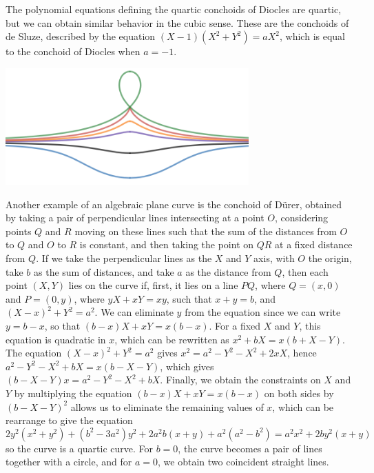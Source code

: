 \begin{example}
    The polynomial equations defining the quartic conchoids of Diocles are quartic, but we can obtain similar behavior in the cubic sense. These are the conchoids of de Sluze, described by the equation $(X-1)(X^2 + Y^2) = aX^2$, which is equal to the conchoid of Diocles when $a = -1$.

    \begin{center}
        \includegraphics[width=0.7\textwidth]{algebraicGeometryConchoidDesluze}
    \end{center}
\end{example}

\begin{example}
    Another example of an algebraic plane curve is the conchoid of D\"{u}rer, obtained by taking a pair of perpendicular lines intersecting at a point $O$, considering points $Q$ and $R$ moving on these lines such that the sum of the distances from $O$ to $Q$ and $O$ to $R$ is constant, and then taking the point on $QR$ at a fixed distance from $Q$. If we take the perpendicular lines as the $X$ and $Y$ axis, with $O$ the origin, take $b$ as the sum of distances, and take $a$ as the distance from $Q$, then each point $(X,Y)$ lies on the curve if, first, it lies on a line $PQ$, where $Q = (x,0)$ and $P = (0,y)$, where $yX + xY = xy$, such that $x + y = b$, and $(X - x)^2 + Y^2 = a^2$. We can eliminate $y$ from the equation since we can write $y = b -x$, so that $(b-x)X + xY = x(b-x)$. For a fixed $X$ and $Y$, this equation is quadratic in $x$, which can be rewritten as $x^2 + bX = x(b + X - Y)$. The equation $(X - x)^2 + Y^2 = a^2$ gives $x^2 = a^2 - Y^2 - X^2 + 2xX$, hence $a^2 - Y^2 - X^2 + bX = x(b - X - Y)$, which gives $(b - X - Y)x = a^2 - Y^2 - X^2 + bX$. Finally, we obtain the constraints on $X$ and $Y$ by multiplying the equation $(b - x)X + xY = x(b - x)$ on both sides by $(b - X - Y)^2$ allows us to eliminate the remaining values of $x$, which can be rearrange to give the equation
    \[ 2y^2(x^2 + y^2) + (b^2 - 3a^2)y^2 + 2a^2b(x + y) + a^2(a^2 - b^2) = a^2x^2 + 2by^2(x + y) \]
    so the curve is a quartic curve. For $b = 0$, the curve becomes a pair of lines together with a circle, and for $a = 0$, we obtain two coincident straight lines.
\end{example}

